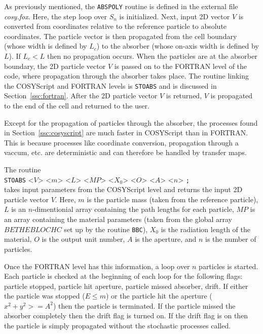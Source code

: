 \label{ssc:cosyscript}

As previously mentioned, the \texttt{ABSPOLY} routine is defined in the external file \textit{cosy.fox}. Here, the step loop over $S_n$ is initialized. Next, input 2D vector $V$ is converted from coordinates relative to the reference particle to absolute coordinates. The particle vector is then propagated from the cell boundary (whose width is defined by $L_c$) to the absorber (whose on-axis width is defined by $L$). If $L_c<L$ then no propagation occurs. When the particles are at the absorber boundary, the 2D particle vector $V$ is passed on to the FORTRAN level of the code, where propagation through the absorber takes place. The routine linking the COSYScript and FORTRAN levels is \texttt{STOABS} and is discussed in Section~\ref{ssc:fortran}. After the 2D particle vector $V$ is returned, $V$ is propagated to the end of the cell and returned to the user.

\label{ssc:fortran}

Except for the propagation of particles through the absorber, the processes found in Section~\ref{ssc:cosyscript} are much faster in COSYScript than in FORTRAN. This is because processes like coordinate conversion, propagation through a vaccum, etc. are deterministic and can therefore be handled by transfer maps.

The routine\\
\texttt{STOABS} <$V$> <$m$> <$L$> <$MP$> <$X_0$> <$O$> <$A$> <$n$> \texttt{;} \\
takes input parameters from the COSYScript level and returns the input 2D particle vector $V$. Here, $m$ is the particle mass (taken from the reference particle), $L$ is an $n$-dimentionial array containing the path lengths for each particle, $MP$ is an array containing the material parameters (taken from the global array $BETHEBLOCHC$ set up by the routine \texttt{BBC}), $X_0$ is the radiation length of the material, $O$ is the output unit number, $A$ is the aperture, and $n$ is the number of particles.

Once the FORTRAN level has this information, a loop over $n$ particles is started. Each particle is checked at the beginning of each loop for the following flags: particle stopped, particle hit aperture, particle missed absorber, drift. If either the particle was stopped ($E\leq m$) or the particle hit the aperture ($x^2+y^2>=A^2$) then the particle is terminated. If the particle missed the absorber completely then the drift flag is turned on. If the drift flag is on then the particle is simply propagated without the stochastic processes called.

